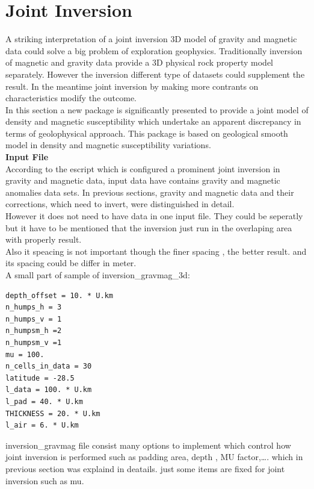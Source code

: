 \chapter{Joint Inversion}\label{Chp:cook:joint inversion}


A striking interpretation of a joint inversion 3D model of gravity and magnetic data could solve a big problem of exploration geophysics. Traditionally inversion of magnetic and gravity data provide a 3D physical rock property model separately. However the inversion different type of datasets could supplement the result. In the meantime joint inversion by making more contrants on characteristics modify the outcome.\\
In this section a new package is significantly presented to provide a joint model of density and magnetic susceptibility which undertake an apparent discrepancy in terms of geolophysical approach. This package is based on geological smooth model in density and magnetic susceptibility variations.\\



\textbf{Input File} \\

According to the escript which is configured a prominent joint inversion in gravity and magnetic data, input data have contains gravity and magnetic anomalies data sets. In previous sections, gravity and magnetic data and their corrections, which need to invert, were distinguished in detail.\\
However it does not need to have data in one input file. They could be seperatly but it have to be mentioned that the inversion just run in the overlaping area with properly result.\\
Also it speacing is not important though the finer spacing , the better result. and its spacing could be differ in meter. \\


A small part of sample of inversion_gravmag_3d:\\
\begin{verbatim}
depth_offset = 10. * U.km
n_humps_h = 3
n_humps_v = 1
n_humpsm_h =2
n_humpsm_v =1
mu = 100.
n_cells_in_data = 30
latitude = -28.5
l_data = 100. * U.km
l_pad = 40. * U.km
THICKNESS = 20. * U.km
l_air = 6. * U.km
\end{verbatim}

inversion_gravmag file consist many options to implement which control how joint inversion is performed such as padding area, depth , MU factor,\ldots. which in previous section was explaind in deatails. just some items are fixed for joint inversion such as mu.\\

